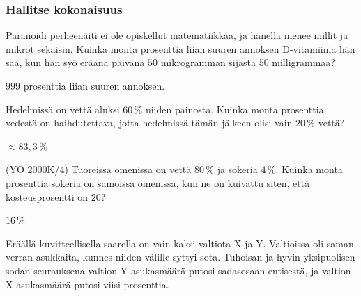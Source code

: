 \begin{tehtavasivu}
\subsubsection*{Hallitse kokonaisuus}

\begin{tehtava}
Paranoidi perheenäiti ei ole opiskellut matematiikkaa, ja hänellä menee millit ja mikrot sekaisin. Kuinka monta prosenttia liian suuren annoksen D-vitamiinia hän saa, kun hän syö eräänä päivänä $50$ mikrogramman sijasta $50$ milligrammaa?
	\begin{vastaus}
 $999$ prosenttia liian suuren annoksen.
	\end{vastaus}
\end{tehtava}


\begin{tehtava}
    Hedelmissä on vettä aluksi $60\,\%$ niiden painosta. Kuinka monta prosenttia vedestä on haihdutettava, jotta hedelmissä tämän jälkeen olisi vain $20\,\%$ vettä?
    \begin{vastaus}
        $\approx83,3\,\%$ %
    \end{vastaus}
\end{tehtava}

\begin{tehtava}
    (YO 2000K/4) Tuoreissa omenissa on vettä $80\,\%$ ja sokeria $4\,\%$. Kuinka monta prosenttia sokeria on samoissa omenissa, kun ne on kuivattu siten, että kosteusprosentti on $20$?
    \begin{vastaus}
        $16\,\%$
    \end{vastaus}
\end{tehtava}

\begin{tehtava}
Eräällä kuvitteellisella saarella on vain kaksi valtiota X ja Y. Valtioissa oli saman verran asukkaita, kunnes niiden välille syttyi sota. Tuhoisan ja hyvin yksipuolisen sodan seurauksena valtion Y asukasmäärä putosi sadasosaan entisestä, ja valtion X asukasmäärä putosi viisi prosenttia.
	\begin{vastaus}
	\end{vastaus}
\end{tehtava}


\end{tehtavasivu}
